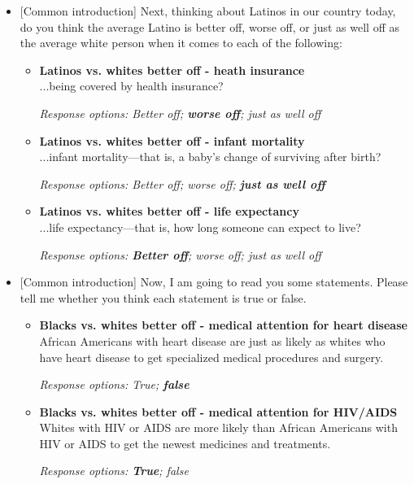 \documentclass[12pt, letterpaper]{article}
\begin{document}
\begin{itemize}
\item{[Common introduction] Next, thinking about Latinos in our country today, do you think the average Latino is better off, worse off, or just as well off as the average white person when it comes to each of the following:}

\begin{itemize}
\item \textbf{Latinos vs. whites better off - heath insurance}\\
...being covered by health insurance?

\textit{Response options: Better off; \textbf{worse off}; just as well off} 
\end{itemize}

\begin{itemize}
\item \textbf{Latinos vs. whites better off - infant mortality}\\
...infant mortality---that is, a baby's change of surviving after birth?

\textit{Response options: Better off; worse off; \textbf{just as well off}} 
\end{itemize}

\begin{itemize}
\item \textbf{Latinos vs. whites better off - life expectancy}\\
...life expectancy---that is, how long someone can expect to live?

\textit{Response options: \textbf{Better off}; worse off; just as well off} 
\end{itemize}

\end{itemize}


\begin{itemize}
\item{[Common introduction] Now, I am going to read you some statements. Please tell me whether you think each statement is true or false.}

\begin{itemize}
\item \textbf{Blacks vs. whites better off - medical attention for heart disease}\\
African Americans with heart disease are just as likely as whites who have heart disease to
get specialized medical procedures and surgery.

\textit{Response options: True; \textbf{false}} 
\end{itemize}

\begin{itemize}
\item \textbf{Blacks vs. whites better off - medical attention for HIV/AIDS}\\
Whites with HIV or AIDS are more likely than African Americans with HIV or AIDS to
get the newest medicines and treatments.

\textit{Response options: \textbf{True}; false} 
\end{itemize}

\end{itemize}
\end{document}
